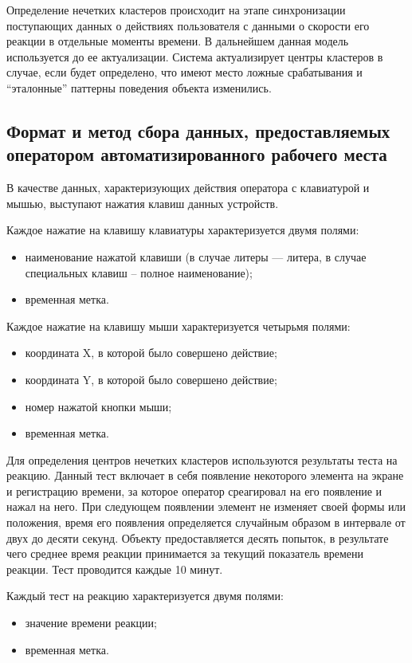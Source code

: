 Определение нечетких кластеров происходит на этапе синхронизации поступающих данных о действиях пользователя с данными о скорости его реакции в отдельные моменты времени. В дальнейшем данная модель используется до ее актуализации. Система актуализирует центры кластеров в случае, если будет определено, что имеют место ложные срабатывания и ``эталонные'' паттерны поведения объекта изменились.

\subsection{Формат и метод сбора данных, предоставляемых оператором автоматизированного рабочего места}
В качестве данных, характеризующих действия оператора с клавиатурой и мышью, выступают нажатия клавиш данных устройств.

Каждое нажатие на клавишу клавиатуры характеризуется двумя полями:
\begin{itemize}[leftmargin=1.6\parindent]
\item наименование нажатой клавиши (в случае литеры --- литера, в случае специальных клавиш -- полное наименование);
\item временная метка.
\end{itemize}

Каждое нажатие на клавишу мыши характеризуется четырьмя полями:
\begin{itemize}[leftmargin=1.6\parindent]
\item координата X, в которой было совершено действие;
\item координата Y, в которой было совершено действие;
\item номер нажатой кнопки мыши;
\item временная метка.
\end{itemize}

Для определения центров нечетких кластеров используются результаты теста на реакцию. Данный тест включает в себя появление некоторого элемента на экране и регистрацию времени, за которое оператор среагировал на его появление и нажал на него. При следующем появлении элемент не изменяет своей формы или положения, время его появления определяется случайным образом в интервале от двух до десяти секунд. Объекту предоставляется десять попыток, в результате чего среднее время реакции принимается за текущий показатель времени реакции. Тест проводится каждые 10 минут.

Каждый тест на реакцию характеризуется двумя полями:
\begin{itemize}[leftmargin=1.6\parindent]
\item значение времени реакции;
\item временная метка.
\end{itemize}

